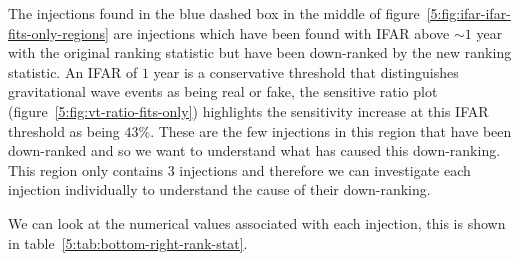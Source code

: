 The injections found in the blue dashed box in the middle of figure~\ref{5:fig:ifar-ifar-fits-only-regions} are injections which have been found with IFAR above $\sim1$ year with the original ranking statistic but have been down-ranked by the new ranking statistic. An IFAR of $1$ year is a conservative threshold that distinguishes gravitational wave events as being real or fake, the sensitive ratio plot (figure~\ref{5:fig:vt-ratio-fits-only}) highlights the sensitivity increase at this IFAR threshold as being $43\%$. These are the few injections in this region that have been down-ranked and so we want to understand what has caused this down-ranking. This region only contains $3$ injections and therefore we can investigate each injection individually to understand the cause of their down-ranking.

We can look at the numerical values associated with each injection, this is shown in table~\ref{5:tab:bottom-right-rank-stat}.
%
